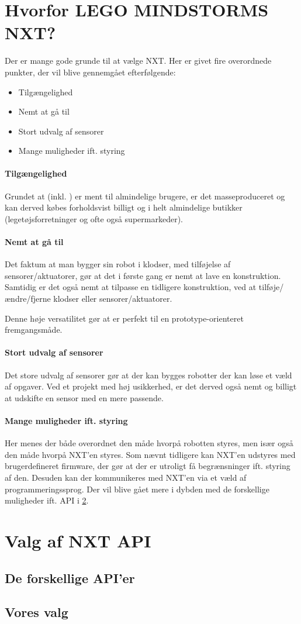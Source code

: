 \section{Hvorfor LEGO MINDSTORMS NXT?}
Der er mange gode grunde til at vælge \legoms NXT.
Her er givet fire overordnede punkter, der vil blive gennemgået efterfølgende:

\begin{itemize}
\item{Tilgængelighed}
\item{Nemt at gå til}
\item{Stort udvalg af sensorer}
\item{Mange muligheder ift. styring}
\end{itemize}

\paragraph{Tilgængelighed}
Grundet at \lego (inkl. \legoms) er ment til almindelige brugere, er det masseproduceret og kan derved købes forholdsvist billigt og i helt almindelige butikker (legetøjsforretninger og ofte også supermarkeder).

\paragraph{Nemt at gå til}
Det faktum at man bygger sin robot i \lego klodser, med tilføjelse af \legoms sensorer/aktuatorer, gør at det i første gang er nemt at lave en konstruktion.
Samtidig er det også nemt at tilpasse en tidligere konstruktion, ved at tilføje/ændre/fjerne klodser eller sensorer/aktuatorer.

Denne høje versatilitet gør at \lego er perfekt til en prototype-orienteret fremgangsmåde.

\paragraph{Stort udvalg af sensorer}
Det store udvalg af sensorer gør at der kan bygges robotter der kan løse et væld af opgaver.
Ved et projekt med høj usikkerhed, er det derved også nemt og billigt at udskifte en sensor med en mere passende.

\paragraph{Mange muligheder ift. styring}
Her menes der både overordnet den måde hvorpå robotten styres, men især også den måde hvorpå NXT'en styres.
Som nævnt tidligere kan NXT'en udstyres med brugerdefineret firmware, der gør at der er utroligt få begrænsninger ift. styring af den.
Desuden kan der kommunikeres med NXT'en via et væld af programmeringssprog.
Der vil blive gået mere i dybden med de forskellige muligheder ift. API i \cref{nxt_api}.


\section{Valg af NXT API}
\label{nxt_api}

\subsection{De forskellige API'er}

\subsection{Vores valg}

